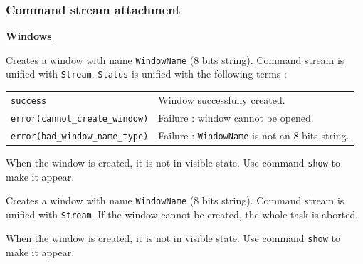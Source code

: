 \subsubsection{Command stream attachment}
\noindent\underline{\bf Windows}\vspace{1ex}\par
{}
\begin{itemize}

Creates a window with name \verb|WindowName| (8 bits string). Command stream
is unified with
\verb|Stream|. \verb|Status| is unified with the following terms :
\vspace{1ex}

\hspace*{15mm}\begin{tabular}{l@{ $\cdots$ }l}
\verb|success| & Window successfully created.\\
\verb|error(cannot_create_window)| & Failure : window cannot be opened.\\
\verb|error(bad_window_name_type)| 
		& Failure : \verb|WindowName| is not an 8 bits string.\\
\end{tabular}

\Caution When the window is created, it is not in visible state. Use command
\verb|show| to make it appear.

Creates a window with name \verb|WindowName| (8 bits string). Command stream
is unified with \verb|Stream|. If the window cannot be created, the whole task
is aborted.

\Caution When the window is created, it is not in visible state. Use command
\verb|show| to make it appear.
\end{itemize}
\vspace{1ex}


